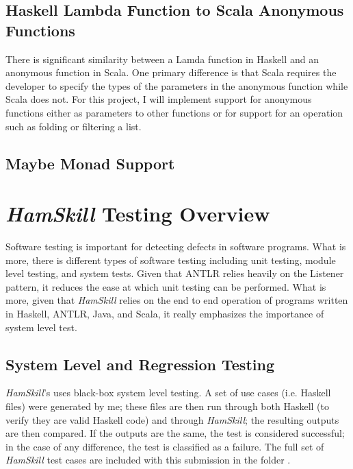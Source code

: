\documentclass{report}
\begin{document}
\subsection{Haskell Lambda Function to Scala Anonymous Functions}\label{sec:lambdaAnonymousFunctions}

There is significant similarity between a Lamda function in Haskell and an anonymous function in Scala.  One primary difference is that Scala requires the developer to specify the types of the parameters in the anonymous function while Scala does not. For this project, I will implement support for anonymous functions either as parameters to other functions or for support for an operation such as folding or filtering a list. 

\subsection{Maybe Monad Support}

\section{\textit{HamSkill} Testing Overview}

Software testing is important for detecting defects in software programs.  What is more, there is different types of software testing including unit testing, module level testing, and system tests.  Given that ANTLR relies heavily on the Listener pattern, it reduces the ease at which unit testing can be performed.  What is more, given that \textit{HamSkill} relies on the end to end operation of programs written in Haskell, ANTLR, Java, and Scala, it really emphasizes the importance of system level test.

\subsection{System Level and Regression Testing}

\textit{HamSkill}'s uses black-box system level testing.  A set of use cases (i.e. Haskell files) were generated by me; these files are then run through both Haskell (to verify they are valid Haskell code) and through \textit{HamSkill}; the resulting outputs are then compared.  If the outputs are the same, the test is considered successful; in the case of any difference, the test is classified as a failure.  The full set of \textit{HamSkill} test cases are included with this submission in the folder .
\end{document}
